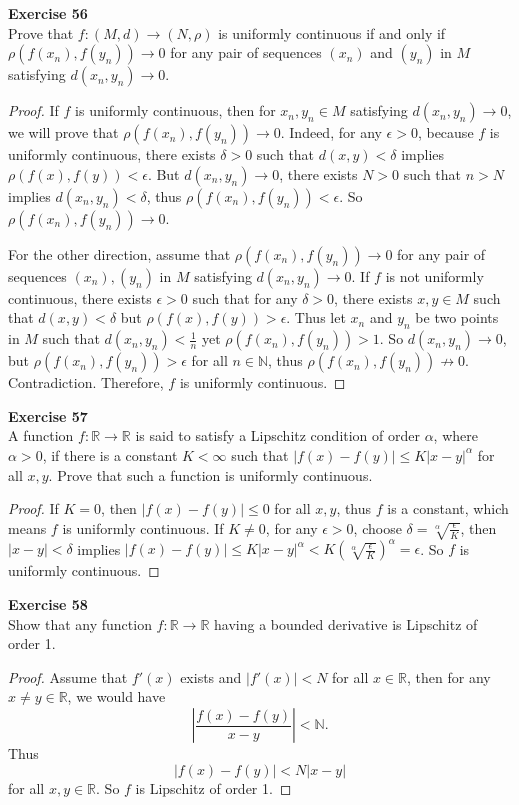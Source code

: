 \documentclass[12pt, a4paper]{article}
\theoremstyle{plain}
\newcommand{\N}{\mathbb{N}}
\newcommand{\R}{\mathbb{R}}
\newenvironment{exercise}[2][Exercise]
    { \begin{mdframed}[backgroundcolor=gray!20] \textbf{#1 #2} \\}
    {  \end{mdframed}}
\begin{document}
\begin{exercise}{56}
Prove that $f:(M,d)\rightarrow (N,\rho)$ is uniformly continuous if and only if $\rho(f(x_n),f(y_n))\rightarrow 0$ for any pair of sequences $(x_n)$ and $(y_n)$ in $M$ satisfying $d(x_n,y_n)\rightarrow 0$.
\end{exercise}
	\begin{proof}
	If $f$ is uniformly continuous, then for $x_n,y_n\in M$ satisfying $d(x_n,y_n)\rightarrow 0$, we will prove that $\rho(f(x_n),f(y_n))\rightarrow 0$. Indeed, for any $\epsilon>0$, because $f$ is uniformly continuous, there exists $\delta>0$ such that $d(x,y)<\delta$ implies $\rho(f(x),f(y))<\epsilon$. But $d(x_n,y_n)\rightarrow 0$, there exists $N>0$ such that $n>N$ implies $d(x_n,y_n)<\delta$, thus $\rho(f(x_n),f(y_n))<\epsilon$. So $\rho(f(x_n),f(y_n))\rightarrow 0$.
	
	For the other direction, assume that $\rho(f(x_n),f(y_n))\rightarrow 0$ for any pair of sequences $(x_n),(y_n)$ in $M$ satisfying $d(x_n,y_n)\rightarrow 0$. If $f$ is not uniformly continuous, there exists $\epsilon>0$ such that for any $\delta>0$, there exists $x,y\in M$ such that $d(x,y)<\delta$ but $\rho(f(x),f(y))>\epsilon$. Thus let $x_n$ and $y_n$ be two points in $M$ such that $d(x_n,y_n)<\frac{1}{n}$ yet $\rho(f(x_n),f(y_n))>1$. So $d(x_n,y_n)\rightarrow 0$, but $\rho(f(x_n),f(y_n))>\epsilon$ for all $n\in\N$, thus $\rho(f(x_n),f(y_n))\not\rightarrow 0$. Contradiction. Therefore, $f$ is uniformly continuous.
	\end{proof}

\begin{exercise}{57}
A function $f:\R\rightarrow \R$ is said to satisfy a Lipschitz condition of order $\alpha$, where $\alpha>0$, if there is a constant $K<\infty$ such that $|f(x)-f(y)|\leq K|x-y|^\alpha$ for all $x,y$. Prove that such a function is uniformly continuous.
\end{exercise}
	\begin{proof}
	If $K=0$, then $|f(x)-f(y)|\leq 0$ for all $x,y$, thus $f$ is a constant, which means $f$ is uniformly continuous. If $K\neq 0$, for any $\epsilon >0$, choose $\delta =\sqrt[\alpha]{\frac{\epsilon}{K}}$, then $|x-y|<\delta$ implies $|f(x)-f(y)|\leq K|x-y|^\alpha<K(\sqrt[\alpha]{\frac{\epsilon}{K}})^\alpha=\epsilon$. So $f$ is uniformly continuous.
	\end{proof}
	
\begin{exercise}{58}
Show that any function $f:\R\rightarrow \R$ having a bounded derivative is Lipschitz of order 1.
\end{exercise}
	\begin{proof}
	Assume that $f'(x)$ exists and $|f'(x)|<N$ for all $x\in\R$, then for any $x\neq y\in\R$, we would have
	\[
	\left|\frac{f(x)-f(y)}{x-y}\right|<\N.
	\]
	Thus
	\[
	|f(x)-f(y)|<N|x-y|
	\]
	for all $x,y\in\R$. So $f$ is Lipschitz of order 1.
	\end{proof}
\end{document}
